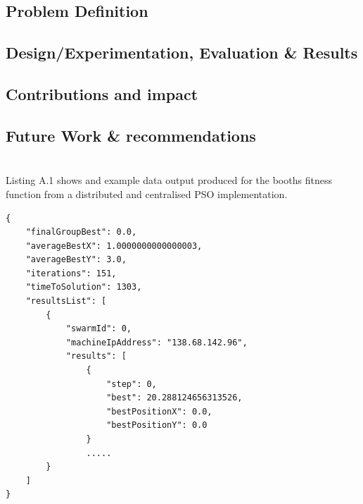 \documentclass[oneside,12pt]{book}
\begin{document}
\section{Problem Definition}
\section{Design/Experimentation, Evaluation \& Results}
\section{Contributions and impact}
\section{Future Work \& recommendations}





\appendix
\chapter{}
Listing A.1 shows and example data output produced for the booths fitness function from a distributed and centralised PSO implementation. 
\begin{lstlisting}
{
	"finalGroupBest": 0.0,
	"averageBestX": 1.0000000000000003,
	"averageBestY": 3.0,
	"iterations": 151,
	"timeToSolution": 1303,
	"resultsList": [
		{
			"swarmId": 0,
			"machineIpAddress": "138.68.142.96",
			"results": [
				{
					"step": 0,
					"best": 20.288124656313526,
					"bestPositionX": 0.0,
					"bestPositionY": 0.0
				}
				.....
		}
	]
}
\end{lstlisting}
\end{document}
